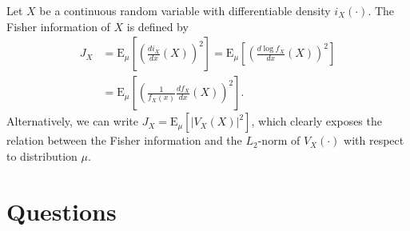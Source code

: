 \begin{definition} \label{definition:FisherInformationX}
Let $X$ be a continuous random variable with differentiable density $i_X (\cdot)$.
The Fisher information of $X$ is defined by
\begin{equation} \label{equation:FisherInformationX}
\begin{split}
J_X &= \mathrm{E}_{\mu} \left[ \left( \frac{d i_X}{dx} (X) \right)^2 \right]
= \mathrm{E}_{\mu} \left[ \left( \frac{d \log f_X}{dx} (X) \right)^2 \right] \\
&= \mathrm{E}_{\mu} \left[ \left( \frac{1}{f_X (x)} \frac{d f_X}{dx} (X) \right)^2 \right] .
\end{split}
\end{equation}
Alternatively, we can write $J_X = \mathrm{E}_{\mu} \left[ \left| V_X (X) \right|^2 \right]$, which clearly exposes the relation between the Fisher information and the $L_2$-norm of $V_X (\cdot)$ with respect to distribution $\mu$.
\end{definition}



\newpage

\section{Questions}

